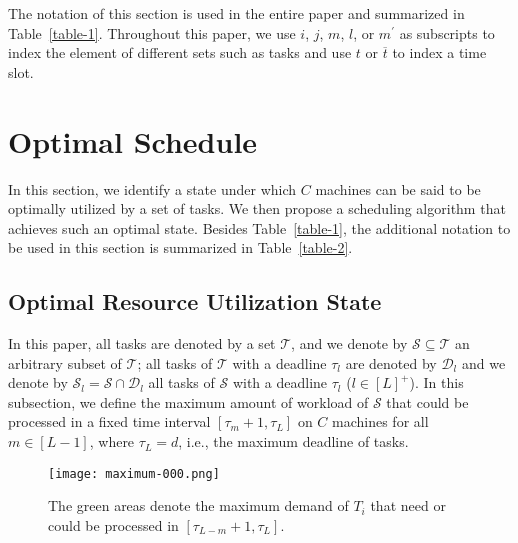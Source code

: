 \documentclass[10pt,journal,compsoc]{IEEEtran}
\begin{document}
The notation of this section is used in the entire paper and summarized in Table~\ref{table-1}. Throughout this paper, we use $i$, $j$, $m$, $l$, or $m^{\prime}$ as subscripts to index the element of different sets such as tasks and use $t$ or $\overline{t}$ to index a time slot.



\section{Optimal Schedule}
\label{sec.optimal}

In this section, we identify a state under which $C$ machines can be said to be optimally utilized by a set of tasks. We then propose a scheduling algorithm that achieves such an optimal state. Besides Table~\ref{table-1}, the additional notation to be used in this section is summarized in Table~\ref{table-2}. 







\subsection{Optimal Resource Utilization State}
\label{sec.optimal-utilization}


In this paper, all tasks are denoted by a set $\mathcal{T}$, and we denote by $\mathcal{S}\subseteq\mathcal{T}$ an arbitrary subset of $\mathcal{T}$; all tasks of $\mathcal{T}$ with a deadline $\tau_{l}$ are denoted by $\mathcal{D}_{l}$ and we denote by $\mathcal{S}_{l}=\mathcal{S}\cap\mathcal{D}_{l}$ all tasks of $\mathcal{S}$ with a deadline $\tau_{l}$ ($l\in[L]^{+}$). In this subsection, we define the maximum amount of workload of $\mathcal{S}$ that could be processed in a fixed time interval $[\tau_{m}+1, \tau_{L}]$ on $C$ machines for all $m\in[L-1]$, where $\tau_{L}=d$, i.e., the maximum deadline of tasks.















\begin{figure}[!ht]\centering

\texttt{[image: maximum-000.png]}

  \caption{The green areas denote the maximum demand of $T_{i}$ that need or could be processed in $[\tau_{L-m}+1, \tau_{L}]$.}\label{Fig.1}
\end{figure}
\end{document}
